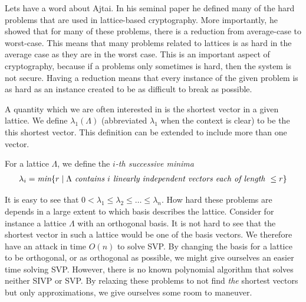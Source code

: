     Lets have a word about Ajtai. In his seminal paper\cite{Ajtai} he defined many of the hard problems that are used in lattice-based cryptography. More importantly, he showed that for many of these problems, there is a reduction from average-case to worst-case. This means that many problems related to lattices is as hard in the average case as they are in the worst case. This is an important aspect of cryptography, because if a problems only sometimes is hard, then the system is not secure. Having a reduction means that every instance of the given problem is as hard as an instance created to be as difficult to break as possible.\par
    
    A quantity which we are often interested in is the shortest vector in a given lattice. We define \(\lambda_1(\Lambda)\) (abbreviated \(\lambda_1\) when the context is clear) to be the this shortest vector. This definition can be extended to include more than one vector.
    \begin{definition}
        For a lattice \(\Lambda\), we define the \emph{\(i\)-th successive minima}
        \begin{align*}
            \lambda_i = \emph{min}\{r\;|\;\Lambda\emph{ contains } i \emph{ linearly independent vectors each of length }\leq r\}
        \end{align*}
    \end{definition}
    It is easy to see that \(0 < \lambda_1 \leq \lambda_2 \leq\dots\leq\lambda_n\). How hard these problems are depends in a large extent to which basis describes the lattice. Consider for instance a lattice \(\Lambda\) with an orthogonal basis. It is not hard  to see that the shortest vector in such a lattice would be one of the basis vectors. We therefore have an attack in time \(O(n)\) to solve SVP. By changing the basis for a lattice to be orthogonal, or as orthogonal as possible, we might give ourselves an easier time solving SVP. However, there is no known polynomial algorithm that solves neither SIVP or SVP. By relaxing these problems to not find \emph{the} shortest vectors but only approximations, we give ourselves some room to maneuver.
    
